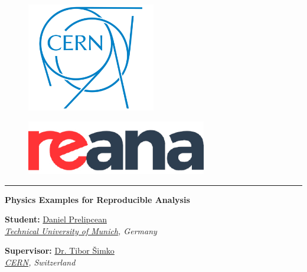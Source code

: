 \begin{center}



\begin{figure}[H]
    \centering
    \begin{minipage}[H]{0.49\textwidth}
        \centering
    \includegraphics[width=0.5\textwidth]{misc/cern_logo.png}
     \end{minipage}
 \hfill
    \begin{minipage}[H]{0.49\textwidth}
        \centering
        \includegraphics[width=0.7\textwidth]{misc/reana_logo.jpg}\\
     \end{minipage}
\end{figure}


\hrule
\vspace{3mm}
\huge\textbf{Physics Examples for Reproducible Analysis} 
\vspace{2mm}

\begin{center}
    \begin{minipage}[t]{0.45\textwidth}
        \large{
            \textbf{Student:} \href{https://quantumdaniel.wordpress.com/}{Daniel Prelipcean}\\
            \emph{\href{https://www.tum.de/en/}{Technical University of Munich}, Germany}
        }
    \end{minipage}
\hfill
    \begin{minipage}[t]{0.45\textwidth}
        \raggedleft
        \large{
            \textbf{Supervisor:} \href{http://tiborsimko.org/}{Dr. Tibor Šimko}\\
            \emph{\href{https://home.cern/}{CERN}, Switzerland}
        }
    \end{minipage}


\end{center}
\end{center}
